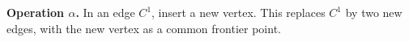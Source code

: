 \textbf{Operation $\alpha$.} In an edge $C^1$, insert a new vertex. This replaces $C^1$ by two new edges, with the new vertex as a common frontier point.

